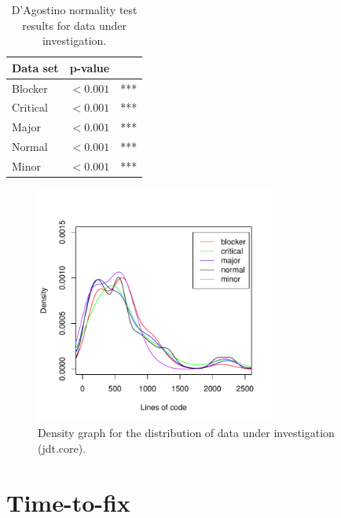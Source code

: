 \begin{table}[!ht]\footnotesize
	\centering
	\begin{tabular}{lrl}
		\toprule
		Data set & p-value & \\
		\midrule
		Blocker & $< 0.001$ & *** \\
		Critical & $< 0.001$ & *** \\
		Major & $< 0.001$ & *** \\
		Normal & $< 0.001$ & *** \\
		Minor & $< 0.001$ & *** \\
		\bottomrule
	\end{tabular} 
	\caption{D'Agostino normality test results for data under investigation.}
	\label{tab:class-sev-core-agostino}
\end{table}

\begin{figure}[!ht]
	\centering
		\includegraphics[width=0.7\textwidth]{img/sev-core-density.pdf}
	\caption{Density graph for the distribution of data under investigation (jdt.core).}
	\label{fig:class-sev-core-density}
\end{figure}


\section{Time-to-fix} %

